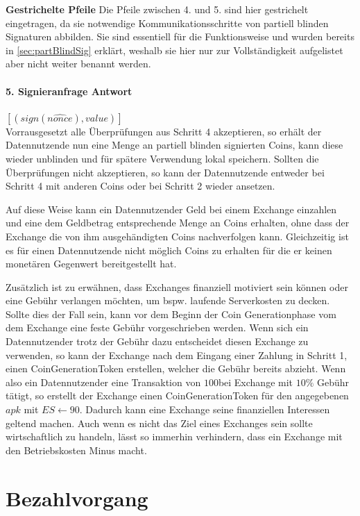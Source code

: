 \documentclass[11pt,a4paper]{scrreprt}
\begin{document}
\textbf{Gestrichelte Pfeile}
Die Pfeile zwischen 4. und 5. sind hier gestrichelt eingetragen, da sie notwendige Kommunikationsschritte von partiell blinden Signaturen abbilden. Sie sind essentiell für die Funktionsweise und wurden bereits in \ref{sec:partBlindSig} erklärt, weshalb sie hier nur zur Vollständigkeit aufgelistet aber nicht weiter benannt werden.

\paragraph{5. Signieranfrage Antwort} $[(sign(\widehat{nonce}),value)]$ \\
Vorrausgesetzt alle Überprüfungen aus Schritt 4 akzeptieren, so erhält der Datennutzende nun eine Menge an partiell blinden signierten Coins, kann diese wieder unblinden und für spätere Verwendung lokal speichern. Sollten die Überprüfungen nicht akzeptieren, so kann der Datennutzende entweder bei Schritt 4 mit anderen Coins oder bei Schritt 2 wieder ansetzen.

Auf diese Weise kann ein Datennutzender Geld bei einem Exchange einzahlen und eine dem Geldbetrag entsprechende Menge an Coins erhalten, ohne dass der Exchange die von ihm ausgehändigten Coins nachverfolgen kann. Gleichzeitig ist es für einen Datennutzende nicht möglich Coins zu erhalten für die er keinen monetären Gegenwert bereitgestellt hat.

Zusätzlich ist zu erwähnen, dass Exchanges finanziell motiviert sein können oder eine Gebühr verlangen möchten, um bspw. laufende Serverkosten zu decken. Sollte dies der Fall sein, kann vor dem Beginn der Coin Generationphase vom dem Exchange eine feste Gebühr vorgeschrieben werden. Wenn sich ein Datennutzender trotz der Gebühr dazu entscheidet diesen Exchange zu verwenden, so kann der Exchange nach dem Eingang einer Zahlung in Schritt 1, einen CoinGenerationToken erstellen, welcher die Gebühr bereits abzieht. Wenn also ein Datennutzender eine Transaktion von $100$\texteuro bei Exchange mit $10\%$ Gebühr tätigt, so erstellt der Exchange einen CoinGenerationToken für den angegebenen $apk$ mit $ES \leftarrow 90$\texteuro. Dadurch kann eine Exchange seine finanziellen Interessen geltend machen. Auch wenn es nicht das Ziel eines Exchanges sein sollte wirtschaftlich zu handeln, lässt so immerhin verhindern, dass ein Exchange mit den Betriebskosten Minus macht.

\section{Bezahlvorgang}
\end{document}
